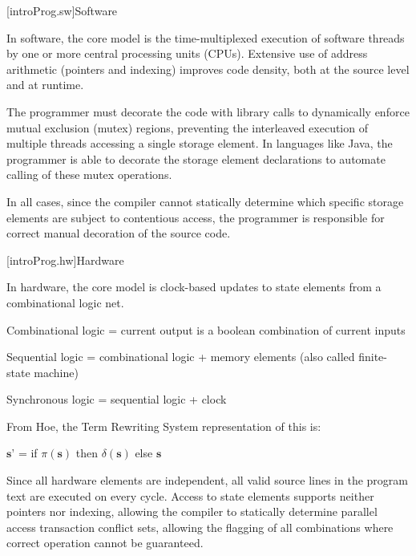
\pnum
{}[introProg.sw]{Software}

In software, the core model is the time-multiplexed execution
of software threads by one or more central processing units (CPUs).
Extensive use of address arithmetic (pointers
and indexing) improves code density, both at the source level and at
runtime.

The programmer
must decorate the code with library calls to dynamically enforce
mutual exclusion (mutex) regions, preventing the interleaved execution of
multiple threads accessing a single storage element.
In languages like Java, the programmer is able to decorate the
storage element declarations to automate calling of these mutex operations.

In all cases, since the compiler cannot statically determine which specific
storage elements are subject to contentious access, the programmer is responsible
for correct manual decoration of the source code.

[introProg.hw]{Hardware}

In hardware, the core model is clock-based updates to state elements from
a combinational logic net.

Combinational logic = current output is a boolean combination of current inputs

Sequential logic = combinational logic + memory elements
(also called finite-state machine)

Synchronous logic = sequential logic + clock


From Hoe\cite{Hoe:Thesis}, the Term Rewriting System representation of this is:

$\textbf{s'}$ = if $\pi(\textbf{s})$ then $\delta(\textbf{s})$ else $\textbf{s}$

Since all hardware elements are independent, all valid source lines in the
program text are executed on every cycle.
Access to state elements supports neither pointers nor indexing, allowing the
compiler to statically determine parallel access transaction conflict sets,
allowing the flagging of all combinations where correct operation cannot
be guaranteed.
